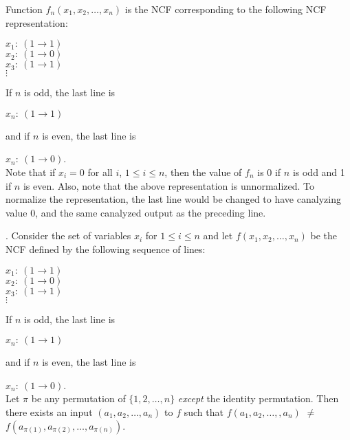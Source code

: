 Function $f_n(x_1, x_2, \ldots, x_n)$ is the NCF corresponding to
the following NCF representation:

\medskip
\noindent
\hspace*{0.5in}
$x_1:~ (1 \rightarrow 1)$ \\
\hspace*{0.5in}
$x_2:~ (1 \rightarrow 0)$ \\
\hspace*{0.5in}
$x_3:~ (1 \rightarrow 1)$ \\
\hspace*{0.75in}
$\vdots$ 

\noindent
If $n$ is odd, the last line is 

\noindent
\hspace*{0.5in}
$x_n:~ (1 \rightarrow 1)$ 

\noindent
and if $n$ is even, the last line is 

\noindent
\hspace*{0.5in}
$x_n:~ (1 \rightarrow 0)$. \\

Note that if $x_i = 0$ for all $i$, $1 \leq i \leq n$, then the
value of $f_n$ is 0 if $n$ is odd and 1 if $n$ is even.  Also, note
that the above representation is unnormalized. To normalize the
representation, the last line would be changed to have canalyzing
value 0, and the same canalyzed output as the preceding line.






\iffalse
\begin{theorem}\label{thm:ncf_asymmetry}.
Consider the set of variables $x_i$ for $1 \leq i \leq n$ and 
let $f(x_1, x_2, \ldots, x_n)$ be the NCF defined by the following sequence
of lines:

\medskip
\noindent
\hspace*{0.5in}
$x_1:~ (1 \rightarrow 1)$ \\
\hspace*{0.5in}
$x_2:~ (1 \rightarrow 0)$ \\
\hspace*{0.5in}
$x_3:~ (1 \rightarrow 1)$ \\
\hspace*{0.75in}
$\vdots$ 

\noindent
If $n$ is odd, the last line is 

\noindent
\hspace*{0.5in}
$x_n:~ (1 \rightarrow 1)$ 

\noindent
and if $n$ is even, the last line is 

\noindent
\hspace*{0.5in}
$x_n:~ (1 \rightarrow 0)$. \\

\noindent
Let $\pi$ be any permutation of $\{1, 2, \ldots, n\}$
\emph{except} the identity permutation.
Then there exists an input $(a_1, a_2, \ldots,  a_n)$ 
to $f$ such that $f(a_1, a_2, \ldots, ,a_n)$ $\neq$  
$f(a_{\pi(1)}, a_{\pi(2)}, \ldots, a_{\pi(n)})$.
\end{theorem}


